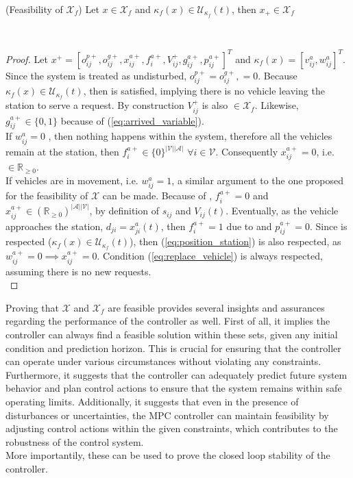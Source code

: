 \begin{proposition}{(Feasibility of $\mathcal{X}_f$)}\label{pro:feas_xf}
	Let $x \in \mathcal{X}_f$ and $\kappa_f(x) \in \mathcal{U}_{\kappa_f}(t)$, then $x_+\in \mathcal{X}_f$
\end{proposition}\\

\begin{proof}
 Let $x^+ = [o_{ij}^{p+}, o_{ij}^{g+}, x_{ij}^{a+}, f^{a+}_{i}, V_{ij}^{+}, g^{a+}_{ij}, p^{a+}_{ij}]^T$ and $\kappa_f(x) = [v^{a}_{ij}, w^{a}_{ij}]^T$. Since the system is treated as undisturbed, $o_{ij}^{p+}= o_{ij}^{g+},=0$. Because $\kappa_f(x) \in \mathcal{U}_{\kappa_f}(t)$, then  is satisfied, implying there is no vehicle leaving the station to serve a request. By construction $V_{ij}^{+}$ is also $\in \mathcal{X}_f$. Likewise, $g^{a+}_{ij}\in \{0,1\}$ because of (\ref{eq:arrived_variable}). \\
If $w^a_{ij} = 0$ , then nothing happens within the system, therefore all the vehicles remain at the station, then $ f^{a+}_{i} \in \{0\}^{|\mathcal{V}||\mathcal{A}|}$ $\forall i \in \mathcal{V}$. Consequently   $x_{ij}^{a+} = 0$, i.e.  $\in \mathbb{R}_{\ge 0}$.\\
If vehicles are in movement, i.e. $w^a_{ij} = 1$, a similar argument to the one proposed for the feasibility of $\mathcal{X}$ can be made. Because of , $f^{a+}_{i}=0$ and $x_{ij}^{a+}\in (\mathbb{R}_{\ge 0})^{|\mathcal{A}||\mathcal{V}|}$, by definition of $s_{ij}$ and $V_{ij}(t)$. Eventually, as the vehicle approaches the station, $d_{ji} = x^a_{ji}(t)$, then $f^{a+}_{i}=1$ due to  and $p^{a+}_{ij}=0$. Since 
 is respected ($\kappa_f(x) \in \mathcal{U}_{\kappa_f}(t)$), then  (\ref{eq:position_station}) is also respected, as $ w^{a+}_{ij}=0 \implies x_{ij}^{a+}=0$. Condition (\ref{eq:replace_vehicle}) is always respected, assuming there is no new requests. \\
\end{proof}
 Proving that $\mathcal{X}$ and $\mathcal{X}_f$ are feasible provides several insights and assurances regarding the performance of the controller as well. First of all, it implies the controller can always find a feasible solution within these sets, given any initial condition and prediction horizon. This is crucial for ensuring that the controller can operate under various circumstances without violating any constraints. Furthermore, it suggests that the controller can adequately predict future system behavior and plan control actions to ensure that the system remains within safe operating limits. Additionally, it suggests that even in the presence of disturbances or uncertainties, the MPC controller can maintain feasibility by adjusting control actions within the given constraints, which contributes to the robustness of the control system. \\
 More importantily, these can be used to prove the closed loop stability of the controller. \\

